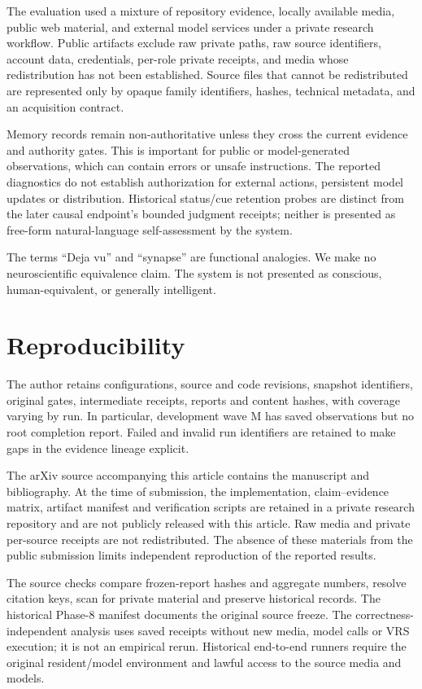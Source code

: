 \documentclass[11pt]{article}
\begin{document}
The evaluation used a mixture of repository evidence, locally available media, public web material, and external model services under a private research workflow.  Public artifacts exclude raw private paths, raw source identifiers, account data, credentials, per-role private receipts, and media whose redistribution has not been established.  Source files that cannot be redistributed are represented only by opaque family identifiers, hashes, technical metadata, and an acquisition contract.

Memory records remain non-authoritative unless they cross the current evidence and authority gates. This is important for public or model-generated observations, which can contain errors or unsafe instructions. The reported diagnostics do not establish authorization for external actions, persistent model updates or distribution. Historical status/cue retention probes are distinct from the later causal endpoint's bounded judgment receipts; neither is presented as free-form natural-language self-assessment by the system.

The terms ``Deja vu'' and ``synapse'' are functional analogies.  We make no neuroscientific equivalence claim.  The system is not presented as conscious, human-equivalent, or generally intelligent.

\section{Reproducibility}
\label{sec:reproducibility}

The author retains configurations, source and code revisions, snapshot identifiers, original gates, intermediate receipts, reports and content hashes, with coverage varying by run. In particular, development wave M has saved observations but no root completion report. Failed and invalid run identifiers are retained to make gaps in the evidence lineage explicit.

The arXiv source accompanying this article contains the manuscript and bibliography. At the time of submission, the implementation, claim--evidence matrix, artifact manifest and verification scripts are retained in a private research repository and are not publicly released with this article. Raw media and private per-source receipts are not redistributed. The absence of these materials from the public submission limits independent reproduction of the reported results.

The source checks compare frozen-report hashes and aggregate numbers, resolve citation keys, scan for private material and preserve historical records. The historical Phase-8 manifest documents the original source freeze. The correctness-independent analysis uses saved receipts without new media, model calls or VRS execution; it is not an empirical rerun. Historical end-to-end runners require the original resident/model environment and lawful access to the source media and models.
\end{document}
